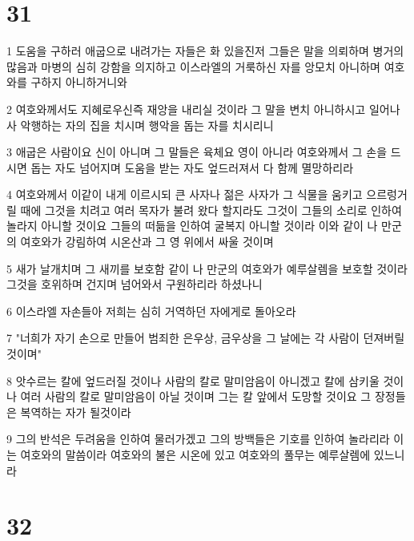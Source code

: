 \chapter{31}

\par 1 도움을 구하러 애굽으로 내려가는 자들은 화 있을진저 그들은 말을 의뢰하며 병거의 많음과 마병의 심히 강함을 의지하고 이스라엘의 거룩하신 자를 앙모치 아니하며 여호와를 구하지 아니하거니와
\par 2 여호와께서도 지혜로우신즉 재앙을 내리실 것이라 그 말을 변치 아니하시고 일어나사 악행하는 자의 집을 치시며 행악을 돕는 자를 치시리니
\par 3 애굽은 사람이요 신이 아니며 그 말들은 육체요 영이 아니라 여호와께서 그 손을 드시면 돕는 자도 넘어지며 도움을 받는 자도 엎드러져서 다 함께 멸망하리라
\par 4 여호와께서 이같이 내게 이르시되 큰 사자나 젊은 사자가 그 식물을 움키고 으르렁거릴 때에 그것을 치려고 여러 목자가 불려 왔다 할지라도 그것이 그들의 소리로 인하여 놀라지 아니할 것이요 그들의 떠듦을 인하여 굴복지 아니할 것이라 이와 같이 나 만군의 여호와가 강림하여 시온산과 그 영 위에서 싸울 것이며
\par 5 새가 날개치며 그 새끼를 보호함 같이 나 만군의 여호와가 예루살렘을 보호할 것이라 그것을 호위하며 건지며 넘어와서 구원하리라 하셨나니
\par 6 이스라엘 자손들아 저희는 심히 거역하던 자에게로 돌아오라
\par 7 "너희가 자기 손으로 만들어 범죄한 은우상, 금우상을 그 날에는 각 사람이 던져버릴 것이며"
\par 8 앗수르는 칼에 엎드러질 것이나 사람의 칼로 말미암음이 아니겠고 칼에 삼키울 것이나 여러 사람의 칼로 말미암음이 아닐 것이며 그는 칼 앞에서 도망할 것이요 그 장정들은 복역하는 자가 될것이라
\par 9 그의 반석은 두려움을 인하여 물러가겠고 그의 방백들은 기호를 인하여 놀라리라 이는 여호와의 말씀이라 여호와의 불은 시온에 있고 여호와의 풀무는 예루살렘에 있느니라

\chapter{32}


